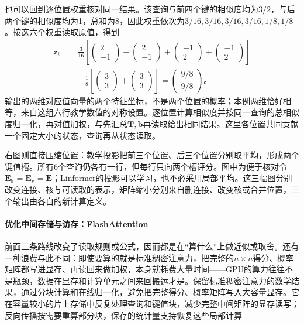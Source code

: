 也可以回到逐位置权重核对同一结果。该查询与前四个键的相似度均为$3/2$，与后两个键的相似度均为1，总和为8，因此权重依次为$3/16,3/16,3/16,3/16,1/8,1/8$。按这六个权重读取原值，得到
\[
  \begin{aligned}
    \bm z_i
      &=\frac3{16}\left[
          \begin{pmatrix}2\\-1\end{pmatrix}
         +\begin{pmatrix}2\\-1\end{pmatrix}
         +\begin{pmatrix}-1\\2\end{pmatrix}
         +\begin{pmatrix}-1\\2\end{pmatrix}\right]\\
      &\quad+\frac18\left[
          \begin{pmatrix}3\\3\end{pmatrix}
         +\begin{pmatrix}3\\3\end{pmatrix}\right]
       =\begin{pmatrix}9/8\\9/8\end{pmatrix}\text{。}
  \end{aligned}
\]
输出的两维对应值向量的两个特征坐标，不是两个位置的概率；本例两维恰好相等，来自这组六行教学数值的对称设置。逐位置计算相似度并按同一查询的总相似度归一化，再对值加权，与先汇总$\bm T,\bm b$再读取给出相同结果。这里各位置共同贡献一个固定大小的状态，查询再从状态读取。

右图则直接压缩位置：教学投影把前三个位置、后三个位置分别取平均，形成两个键值槽。所有6个查询仍各有一行，但每行只向两个槽评分。图中为便于核对令$\bm E_{\mathrm k}=\bm E_{\mathrm v}=\bm E$；Linformer的投影可以学习，也不必采用局部平均。这三幅图分别改变连接、核与可读取的表示，矩阵缩小分别来自删连接、改变核或合并位置，三个输出由各自的新计算定义。



\paragraph{优化中间存储与访存：FlashAttention}

前面三条路线改变了读取规则或公式，因而都是在“算什么”上做近似或取舍。还有一种浪费与此不同：即使要算的就是标准稠密注意力，把完整的$n\times n$得分、概率矩阵都写进显存、再读回来做加权，本身就耗费大量时间——GPU的算力往往不是瓶颈，数据在显存和计算单元之间来回搬运才是。保留标准稠密注意力的数学结果，通过分块计算和在线归一化，避免把完整得分、概率矩阵写入大容量显存。它在容量较小的片上存储中反复处理查询和键值块，减少完整中间矩阵的显存读写；反向传播按需要重算部分块，保存的统计量支持恢复这些局部计算


